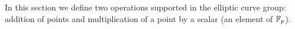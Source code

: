 In this section we define two operations supported in the elliptic curve group: addition of points and multiplication of a point by a scalar (an element of $\mathbb{F}_p$).
